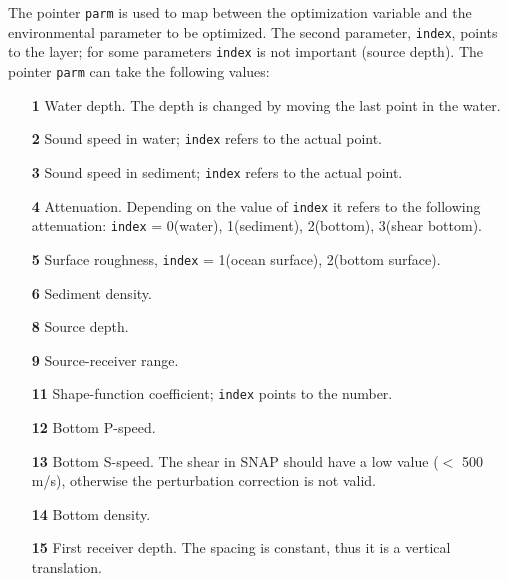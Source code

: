 \documentclass{saclantc}
\begin{document}
The pointer {\tt parm} is used to map between the optimization variable and the
environmental parameter to be optimized. The second parameter, {\tt index}, points to the
layer; for some parameters {\tt index} is not important (source depth).  
The pointer {\tt parm} can take the following values:
\begin{itemize}
    \item[\bf 1]  Water depth. The depth is changed by moving the last 
point in the water.
\vspace{-0.3cm}
    \item[\bf 2] Sound speed in water; {\tt index} refers to the actual point.
\vspace{-0.3cm}
    \item[\bf 3] Sound speed in sediment; {\tt index} refers to the actual point.
\vspace{-0.3cm}
    \item[\bf 4] Attenuation. Depending on the value of  {\tt index}
       it refers to the following attenuation: {\tt index} = 0(water),
1(sediment), 2(bottom), 3(shear bottom).
\vspace{-0.3cm}
    \item[\bf 5]  Surface roughness, {\tt index} = 1(ocean surface), 2(bottom surface).
\vspace{-0.3cm}
    \item[\bf 6] Sediment density.
\vspace{-0.3cm}
    \item[\bf 8] Source depth.
\vspace{-0.3cm}
    \item[\bf 9] Source-receiver range.
\vspace{-0.3cm}
    \item[\bf 11] Shape-function coefficient; {\tt index} points to the number.
\vspace{-0.3cm}
    \item[\bf 12] Bottom P-speed.
\vspace{-0.3cm}
    \item[\bf 13] Bottom S-speed. The shear in
{\sf SNAP} should have a low value ($<$ 500 m/s), otherwise
    the perturbation correction is not valid.
\vspace{-0.3cm}
     \item[\bf 14] Bottom density.
\vspace{-0.3cm}
    \item[\bf 15]  First receiver depth. The spacing is constant, 
    thus it is a vertical translation.
\vspace{-0.3cm}

\end{itemize}
\end{document}
